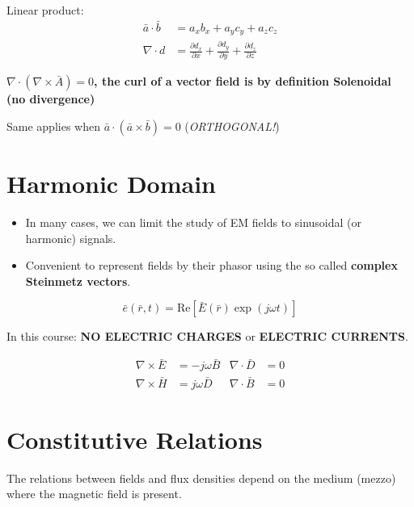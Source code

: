 Linear product:
\begin{align*}
\bar{a} \cdot \bar{b} &= a_x b_x + a_y c_y + a_z c_z \\
\nabla \cdot d &= \frac{\partial d_x}{\partial x} + \frac{\partial d_y}{\partial y} + \frac{\partial d_z}{\partial z}
\end{align*}


\begin{tcolorbox}[enhanced, colback=white, colframe=red, title=\textbf{Important:}, coltitle=red, sharp corners]
\textbf{$\nabla \cdot (\nabla \times \bar{A}) = 0$, the curl of a vector field is by definition Solenoidal (no divergence)}

Same applies when $\bar{a} \cdot (\bar{a} \times \bar{b}) = 0$ (\textit{\small ORTHOGONAL!})
\end{tcolorbox}

\section{Harmonic Domain}

\begin{itemize}
    \item In many cases, we can limit the study of EM fields to sinusoidal (or harmonic) signals.
    \item Convenient to represent fields by their phasor using the so called \textbf{complex Steinmetz vectors}.
\end{itemize}

\begin{equation*}
\bar{e}(\bar{r}, t) = \text{Re}\left[ \bar{E}(\bar{r}) \exp(j\omega t) \right]
\end{equation*}

In this course: \textbf{NO ELECTRIC CHARGES} or \textbf{ELECTRIC CURRENTS}.

\begin{align*}
\nabla \times \bar{E} &= -j \omega \bar{B} & \nabla \cdot \bar{D} &= 0 \\[1em]
\nabla \times \bar{H} &= j \omega \bar{D} & \nabla \cdot \bar{B} &= 0
\end{align*}

\section{Constitutive Relations}

The relations between fields and flux densities depend on the medium (mezzo) where the magnetic field is present.

